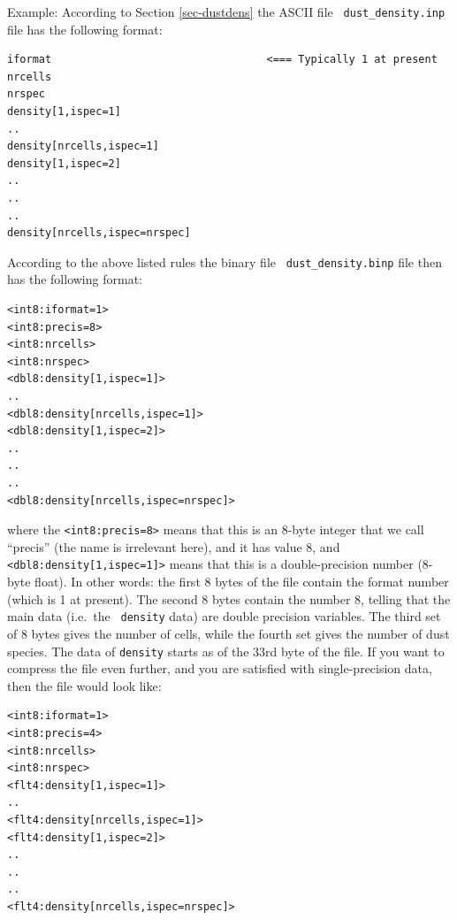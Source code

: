 \documentclass{report}
\newenvironment{asciibox}%
  {\begin{list}{}{%
    \setlength{\topsep}{0.5em}%
    \setlength{\parskip}{0em}%
    \setlength{\parsep}{0em}%
    \setlength{\itemsep}{0em}%
    \setlength{\rightmargin}{0em}%
    \setlength{\leftmargin}{3.0em}%
    \setlength{\labelsep}{1em}%
    \setlength{\labelwidth}{2em}%
  }\normalfont\footnotesize\item}
  {\end{list}}
\begin{document}
Example: According to Section \ref{sec-dustdens} the ASCII file {\small\tt
  dust\_density.inp} file has the following format:
\begin{asciibox}\begin{verbatim}
iformat                                  <=== Typically 1 at present
nrcells
nrspec
density[1,ispec=1]
..
density[nrcells,ispec=1]
density[1,ispec=2]
..
..
..
density[nrcells,ispec=nrspec]
\end{verbatim}\end{asciibox}
According to the above listed rules the binary file {\small\tt
  dust\_density.binp} file then has the following format:
\begin{asciibox}\begin{verbatim}
<int8:iformat=1>
<int8:precis=8>
<int8:nrcells>
<int8:nrspec>
<dbl8:density[1,ispec=1]>
..
<dbl8:density[nrcells,ispec=1]>
<dbl8:density[1,ispec=2]>
..
..
..
<dbl8:density[nrcells,ispec=nrspec]>
\end{verbatim}\end{asciibox}
where the {\small\tt <int8:precis=8>} means that this is an 8-byte integer
that we call ``precis'' (the name is irrelevant here), and it has value 8,
and {\small\tt <dbl8:density[1,ispec=1]>} means that this is a
double-precision number (8-byte float). In other words: the first 8 bytes of
the file contain the format number (which is 1 at present). The second 8
bytes contain the number 8, telling that the main data (i.e.\ the {\small\tt
  density} data) are double precision variables. The third set of 8 bytes
gives the number of cells, while the fourth set gives the number of dust
species. The data of {\small\tt density} starts as of the 33rd byte of the
file. If you want to compress the file even further, and you are satisfied
with single-precision data, then the file would look like:
\begin{asciibox}\begin{verbatim}
<int8:iformat=1>
<int8:precis=4>
<int8:nrcells>
<int8:nrspec>
<flt4:density[1,ispec=1]>
..
<flt4:density[nrcells,ispec=1]>
<flt4:density[1,ispec=2]>
..
..
..
<flt4:density[nrcells,ispec=nrspec]>
\end{verbatim}\end{asciibox}
\end{document}
